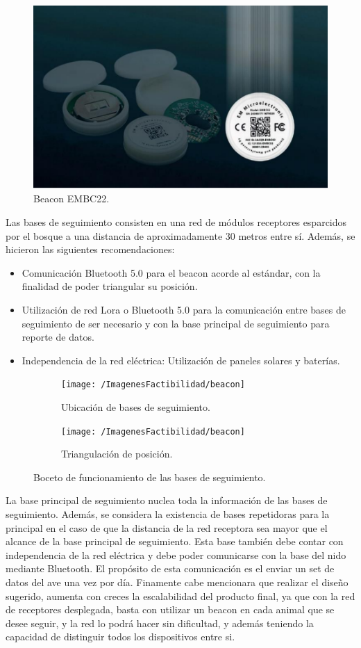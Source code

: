\begin{figure}[H]
	\centering
	\includegraphics[width=0.7\linewidth]{ImagenesFactibilidad/beaconpic}
	\caption{Beacon EMBC22.}
	\label{fig:beacon}
\end{figure}
Las bases de seguimiento consisten en una red de módulos receptores esparcidos por el bosque a una distancia de aproximadamente 30 metros entre sí.
Además, se hicieron las siguientes recomendaciones:
\begin{itemize}
\item Comunicación Bluetooth 5.0 para el beacon acorde al estándar, con la finalidad de poder triangular su posición.
\item Utilización de red Lora o Bluetooth 5.0 para la comunicación entre bases de seguimiento de ser necesario y con la base principal de seguimiento para reporte de datos.
\item Independencia de la red eléctrica: Utilización de paneles solares y baterías.
\end{itemize}
\begin{figure}[H]
\begin{subfigure}{.5\textwidth}
  \centering
  \texttt{[image: /ImagenesFactibilidad/beacon]}
  \caption{Ubicación de bases de seguimiento.}
  \label{fig:sfig1}
\end{subfigure}%
\begin{subfigure}{.5\textwidth}
  \centering
  \texttt{[image: /ImagenesFactibilidad/beacon]}
  \caption{Triangulación de posición.}
  \label{fig:sfig2}
\end{subfigure}%
\caption{Boceto de funcionamiento de las bases de seguimiento.}
\label{fig:fig}
\end{figure}
La base principal de seguimiento nuclea toda la información de las bases de seguimiento. Además, se considera la existencia de bases repetidoras para la principal en el caso de que la distancia de la red receptora sea mayor que el alcance de la base principal de seguimiento.
Esta base también debe contar con independencia de la red eléctrica y debe poder comunicarse con la base del nido mediante Bluetooth. El propósito de esta comunicación es el enviar un set de datos del ave una vez por día.
Finamente cabe mencionara que realizar el diseño sugerido, aumenta con creces la escalabilidad del producto final, ya que con la red de receptores desplegada, basta con utilizar un beacon en cada animal que se desee seguir, y la red lo podrá hacer sin dificultad, y además teniendo la capacidad de distinguir todos los dispositivos entre si.
